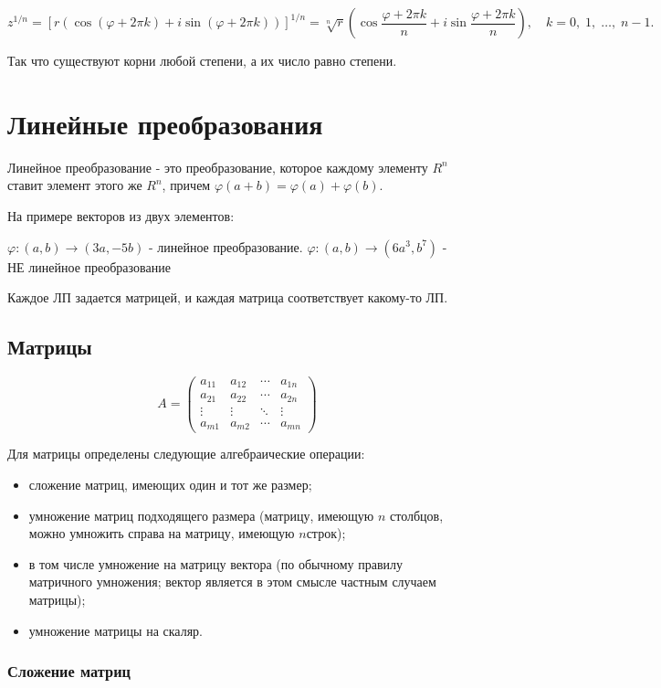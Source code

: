 \documentclass{article}
\begin{document}
$$z^{1/n}=\left[r\left(\cos \left(\varphi +2\pi k\right)+i\sin \left(\varphi +2\pi k\right)\right)\right]^{1/n}={\sqrt[{n}]{r}}\left(\cos {\frac {\varphi +2\pi k}{n}}+i\sin {\frac {\varphi +2\pi k}{n}}\right),\quad k=0,\;1,\;\ldots ,\;n-1.$$

Так что существуют корни любой степени, а их число равно степени.


\section*{Линейные преобразования}

Линейное преобразование - это преобразование, которое каждому элементу $R^n$ ставит элемент этого же $R^n$, причем $\varphi(a+b) = \varphi(a) + \varphi(b)$. 

На примере векторов из двух элементов:

$\varphi: (a,b) \to (3a, -5b)$ - линейное преобразование.
$\varphi: (a,b) \to (6a^3, b^7)$ - НЕ линейное преобразование

Каждое ЛП задается матрицей, и каждая матрица соответствует какому-то ЛП.

\subsection*{Матрицы}

$$A=\begin{pmatrix}
a_{11}  &a_{12}  &\cdots  &a_{1n} \\
a_{21}  &a_{22}  &\cdots  &a_{2n} \\
\vdots  &\vdots  &\ddots  &\vdots \\
a_{m1}&a_{m2}&\cdots  &a_{mn}
\end{pmatrix}$$

Для матрицы определены следующие алгебраические операции:
\begin{itemize}
    \item сложение матриц, имеющих один и тот же размер;
    \item умножение матриц подходящего размера (матрицу, имеющую $n$ столбцов, можно умножить справа на матрицу, имеющую $n$строк);
    \item в том числе умножение на матрицу вектора (по обычному правилу матричного умножения; вектор является в этом смысле частным случаем матрицы);
    \item умножение матрицы на скаляр.
\end{itemize}

\subsubsection*{Сложение матриц}
\end{document}
